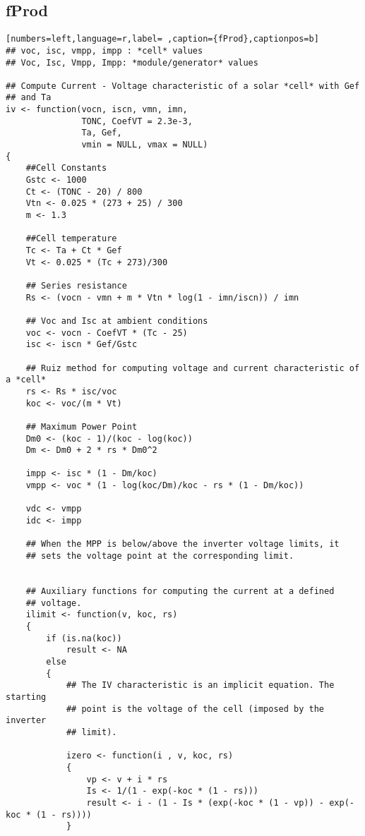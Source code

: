 \subsection{fProd}
\label{sec:orgb595787}
\begin{lstlisting}[numbers=left,language=r,label= ,caption={fProd},captionpos=b]
## voc, isc, vmpp, impp : *cell* values
## Voc, Isc, Vmpp, Impp: *module/generator* values

## Compute Current - Voltage characteristic of a solar *cell* with Gef
## and Ta
iv <- function(vocn, iscn, vmn, imn,
               TONC, CoefVT = 2.3e-3,
               Ta, Gef,
               vmin = NULL, vmax = NULL)
{
    ##Cell Constants
    Gstc <- 1000
    Ct <- (TONC - 20) / 800
    Vtn <- 0.025 * (273 + 25) / 300
    m <- 1.3

    ##Cell temperature
    Tc <- Ta + Ct * Gef
    Vt <- 0.025 * (Tc + 273)/300

    ## Series resistance
    Rs <- (vocn - vmn + m * Vtn * log(1 - imn/iscn)) / imn

    ## Voc and Isc at ambient conditions
    voc <- vocn - CoefVT * (Tc - 25)
    isc <- iscn * Gef/Gstc

    ## Ruiz method for computing voltage and current characteristic of a *cell*
    rs <- Rs * isc/voc
    koc <- voc/(m * Vt)

    ## Maximum Power Point
    Dm0 <- (koc - 1)/(koc - log(koc))
    Dm <- Dm0 + 2 * rs * Dm0^2

    impp <- isc * (1 - Dm/koc)
    vmpp <- voc * (1 - log(koc/Dm)/koc - rs * (1 - Dm/koc))

    vdc <- vmpp
    idc <- impp

    ## When the MPP is below/above the inverter voltage limits, it
    ## sets the voltage point at the corresponding limit.


    ## Auxiliary functions for computing the current at a defined
    ## voltage.
    ilimit <- function(v, koc, rs) 
    {
        if (is.na(koc)) 
            result <- NA
        else
        {
            ## The IV characteristic is an implicit equation. The starting
            ## point is the voltage of the cell (imposed by the inverter
            ## limit). 

            izero <- function(i , v, koc, rs)
            {
                vp <- v + i * rs
                Is <- 1/(1 - exp(-koc * (1 - rs)))
                result <- i - (1 - Is * (exp(-koc * (1 - vp)) - exp(-koc * (1 - rs))))
            }


\end{lstlisting}
